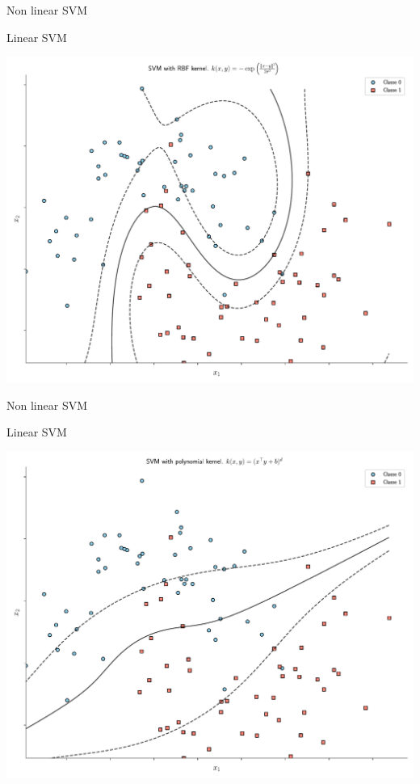 \documentclass[11pt, pdf, compress, handout]{beamer}
\begin{document}
\begin{frame}{Non linear SVM}
  \begin{block}{Linear SVM}
    \begin{center}
      \includegraphics[width=.8\textwidth]{./figures/svm_rbf.pdf}
    \end{center}
\end{block}

\end{frame}
\begin{frame}{Non linear SVM}
  \begin{block}{Linear SVM}
    \begin{center}
          \includegraphics[width=.8\textwidth]{./figures/svm_poly.pdf}
    \end{center}
\end{block}

\end{frame}
\end{document}
